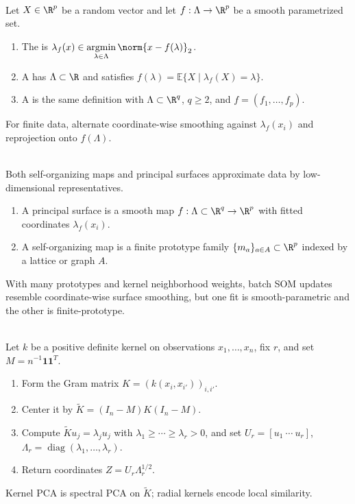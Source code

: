 \begin{definition} \label{def:sl-principal-curves-and-surfaces} \\
Let $X\in\R^p$ be a random vector and let $f:\Lambda\to\R^p$ be a smooth parametrized set.
\begin{enumerate}[label=(\roman*)]
\setlength{\itemsep}{0pt}
\item The  is $\lambda_f(x)\in\operatorname*{argmin}\limits_{\lambda\in\Lambda}\norm{x-f(\lambda)}_2$.
\item A  has $\Lambda\subset\R$ and satisfies $f(\lambda)=\mathbb{E}\{X\mid \lambda_f(X)=\lambda\}$.
\item A  is the same definition with $\Lambda\subset\R^q$, $q\geq2$, and $f=(f_1,\ldots,f_p)$.
\end{enumerate}
For finite data, alternate coordinate-wise smoothing against $\lambda_f(x_i)$ and reprojection onto $f(\Lambda)$.
\end{definition}

\begin{remark} \label{rem:sl-som-versus-principal-surfaces} \\
Both self-organizing maps and principal surfaces approximate data by low-dimensional representatives.
\begin{enumerate}[label=(\roman*)]
\setlength{\itemsep}{0pt}
\item A principal surface is a smooth map $f:\Lambda\subset\R^q\to\R^p$ with fitted coordinates $\lambda_f(x_i)$.
\item A self-organizing map is a finite prototype family $\{m_a\}_{a\in A}\subset\R^p$ indexed by a lattice or graph $A$.
\end{enumerate}
With many prototypes and kernel neighborhood weights, batch SOM updates resemble coordinate-wise surface smoothing, but one fit is smooth-parametric and the other is finite-prototype.
\end{remark}

\begin{method} \label{meth:sl-kernel-pca} \\
Let $k$ be a positive definite kernel on observations $x_1,\ldots,x_n$, fix $r$, and set $M=n^{-1}\mathbf{1}\mathbf{1}^T$.
\begin{enumerate}[label=(\roman*)]
\setlength{\itemsep}{0pt}
\item Form the Gram matrix $K=(k(x_i,x_{i'}))_{i,i'}$.
\item Center it by $\widetilde{K}=(I_n-M)K(I_n-M)$.
\item Compute $\widetilde{K}u_j=\lambda_ju_j$ with $\lambda_1\geq\cdots\geq\lambda_r>0$, and set $U_r=[u_1\ \cdots\ u_r]$, $\Lambda_r=\operatorname{diag}(\lambda_1,\ldots,\lambda_r)$.
\item Return coordinates $Z=U_r\Lambda_r^{1/2}$.
\end{enumerate}
Kernel PCA is spectral PCA on $\widetilde{K}$; radial kernels encode local similarity.
\end{method}

